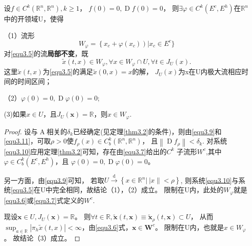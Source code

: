 \begin{theorem}[局部中心流形定理]
	设$f \in C ^ { k } \left( \mathbb { R } ^ { n } , \mathbb { R } ^ { n } \right) , k \geqslant 1$，
	$f ( 0 ) = 0 , \operatorname{ D } f ( 0 ) = 0$，
	则$\exists \varphi \in C ^ { k } \left( E ^ { c } , E ^ { h } \right)$在\(\mathbb{R}^n\) 中的开领域U，使得
	
	（1）流形
	\begin{equation}
		W _ { \varphi } = \left\{ x _ { c } + \varphi \left( x _ { c } \right) \right) | x _ { c } \in E ^ { c } \}
		\label{eq:1.3.12}
	\end{equation}
	对\ref{equ3.5}的流\textbf{局部不变}，既
	\[
		\tilde { x } ( t , x ) \in W _ { \varphi } , \forall x \in W _ { \varphi } \cap U , \forall t \in J _ { U } ( x ).
	\]
	这里\(\tilde{x}(t,x)\)为\ref{equ3.5}的满足$\widetilde { x } ( 0 , x ) = x$的解，
	\(J_U(x)\)为x在U内极大流相应时间的时间区间；
	
	（2）$\varphi ( 0 ) = 0 , \operatorname{D }\varphi ( 0 ) = 0$;
	
	(3)如果$x \in U$，且$J _ { U } ( \boldsymbol { x } ) = \mathbb{ R }$，则$x \in W_\varphi$.
	
\end{theorem}

\begin{proof}
	设与\(\operatorname{A}\)相关的\(\delta_k\)已经确定(见定理\ref{thm3.2}的条件)，则由\ref{equ3.9}和\ref{equ3.11}，可取\(\rho>0\)使$f _ { \rho} ( x ) \in C _ { b } ^ { k } \left( \mathbb { R } ^ { n } , \mathbb { R } ^ { n } \right)$，
	且$\left\| \operatorname { D } f _ { \rho } \right\| < \delta_k$.
	对系统\ref{equ3.10}应用定理\ref{thm3.2}可知，存在由\ref{equ3.7}给出的\(C^k\) 子流形\(W^c\),其中
	$\varphi \in C _ { b } ^ { k } \left( E ^ { c } , E ^ { h } \right)$，且
	$\varphi ( 0 ) = 0 , \operatorname{D} \varphi ( 0 ) = 0$。
	
	另一方面，由\ref{equ3.9}可知，
	若取$U \stackrel { \mathrm { d } } { \longrightarrow } \left\{ x \in \mathbb { R } ^ { n } |\ | x \| < \rho \right\}$,
	则系统\ref{equ3.10}与系统\ref{equ3.5}在U中完全相同，故结论（1），（2）成立。
	限制在U内，此处的\(W_\varphi\)就是\ref{equ3.6}或\ref{equ3.7}式定义的\(W^c\).
	
	现设$\boldsymbol { x } \in U , J _ { U } ( \boldsymbol { x } ) = \mathbb { R }$。
	则$ \forall t \in \mathbb { R } , \tilde { \boldsymbol { x } } ( t , \boldsymbol { x } ) \equiv \tilde { \boldsymbol { x } } _ { \rho } ( t , \boldsymbol { x } ) \subset U$，
	从而$\sup _ { a \in \mathbb { R } } \left| \pi _ { h } \tilde { x } ( t , x ) \right| < \infty$，由\ref{equ3.6}式，$\boldsymbol { x } \in \mathbf { W } ^ { c }$。
	限制在U内，也就是$x \in W _ { \varphi }$。
	故结论（3）成立。
\end{proof}

